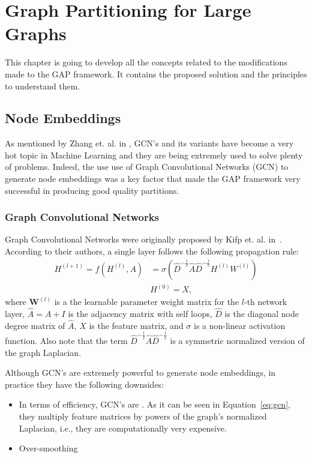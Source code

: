 %
%
\let\textcircled=\pgftextcircled
\chapter{Graph Partitioning for Large Graphs}
\label{Chapter3}
This chapter is going to develop all the concepts related to the modifications made to the GAP framework. It contains the proposed solution and the principles to understand them.

\section{Node Embeddings}
As mentioned by Zhang et. al. in \cite{gcnreview}, GCN's and its variants have become a very hot topic in Machine Learning and they are being extremely used to solve plenty of problems. Indeed, the use use of Graph Convolutional Networks (GCN) to generate node embeddings was a key factor that made the GAP framework very successful in producing good quality partitions.

\subsection{Graph Convolutional Networks}
Graph Convolutional Networks were originally proposed by Kifp et. al. in~\cite{gcn}. According to their authors, a single layer follows the following propagation rule:
\begin{align}
    \label{eq:gcn}
    H^{(l+1)} = f(H^{(l)}, A) &= \sigma\left(\hat{D}^{-\frac{1}{2}}\hat{A}\hat{D}^{-\frac{1}{2}}H^{(l)}W^{(l)}\right) \\
    & H^{(0)} = X,
\end{align}
where $\boldsymbol W^{(l)}$ is a the learnable parameter weight matrix for the $l$-th network layer, $\hat{A}=A+I$ is the adjacency matrix with self loops, $\hat{D}$ is the diagonal node degree matrix of $\hat{A}$, $X$ is the feature matrix, and $\sigma$ is a non-linear activation function. Also note that the term $\hat{D}^{-\frac{1}{2}}\hat{A}\hat{D}^{-\frac{1}{2}}$ is a symmetric normalized version of the graph Laplacian.

\newpage

Although GCN's are extremely powerful to generate node embeddings, in practice they have the following downsides:
\begin{itemize}
    \item In terms of efficiency, GCN's are . As it can be seen in Equation~\ref{eq:gcn}, they multiply feature matrices by powers of the graph's normalized Laplacian, i.e., they are computationally very expensive.
    \item Over-smoothing
\end{itemize}

